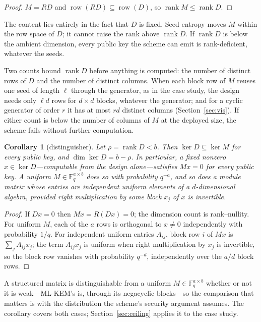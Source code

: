 \documentclass[11pt]{article}
\makeatletter
\newtheorem{corollary}{Corollary}
\theoremstyle{remark}
\newcommand{\F}{\mathbb{F}}
\DeclareMathOperator{\rank}{rank}
\DeclareMathOperator{\row}{row}
\DeclareRobustCommand{\_}{%
  \edef\@tempa{\ttdefault}%
  \ifx\f@family\@tempa\char95 \else\textunderscore\fi\penalty300\relax}
\makeatother
\begin{document}
\begin{proof}
$M=RD$ and $\row(RD)\subseteq\row(D)$, so $\rank M\le\rank D$.
\end{proof}

The content lies entirely in the fact that $D$ is fixed. Seed entropy moves $M$ within the row space of $D$; it cannot
raise the rank above $\rank D$. If $\rank D$ is below the ambient dimension, every public key the scheme can emit is
rank-deficient, whatever the seeds.

Two counts bound $\rank D$ before anything is computed: the number of distinct rows of $D$ and the number of distinct
columns. When each block row of $M$ reuses one seed of length $\ell$ through the generator, as in the case study, the
design needs only $\ell d$ rows for $d\times d$ blocks, whatever the generator; and for a cyclic generator of order $r$
it has at most $rd$ distinct columns (Section~\ref{sec:vis}). If either count is below the number of columns of $M$ at
the deployed size, the scheme fails without further computation.

\begin{corollary}[distinguisher]\label{cor:dist}
Let $\rho=\rank D<b$. Then $\ker D\subseteq\ker M$ for every public key, and $\dim\ker D=b-\rho$. In particular, a fixed
nonzero $x\in\ker D$---computable from the design alone---satisfies $Mx=0$ for every public key. A uniform
$M\in\F_q^{a\times b}$ does so with probability $q^{-a}$, and so does a module matrix whose entries are independent
uniform elements of a $d$-dimensional algebra, provided right multiplication by some block $x_j$ of $x$ is invertible.
\end{corollary}

\begin{proof}
If $Dx=0$ then $Mx=R(Dx)=0$; the dimension count is rank--nullity. For uniform $M$, each of the $a$ rows is orthogonal
to $x\neq0$ independently with probability $1/q$. For independent uniform entries $A_{ij}$, block row $i$ of $Mx$ is
$\sum_j A_{ij}x_j$; the term $A_{ij}x_j$ is uniform when right multiplication by $x_j$ is invertible, so the block row
vanishes with probability $q^{-d}$, independently over the $a/d$ block rows.
\end{proof}

A structured matrix is distinguishable from a uniform $M\in\F_q^{a\times b}$ whether or not it is weak---ML-KEM's is,
through its negacyclic blocks---so the comparison that matters is with the distribution the scheme's security argument
assumes. The corollary covers both cases; Section~\ref{sec:ceiling} applies it to the case study.
\end{document}
